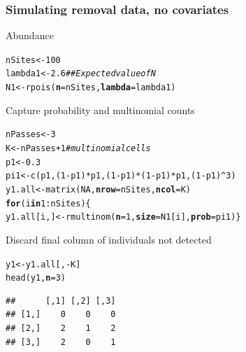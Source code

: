 \documentclass[color=usenames,dvipsnames]{beamer}\usepackage[]{graphicx}\usepackage[]{color}
\makeatletter
\newcommand{\hlnum}[1]{\textcolor[rgb]{0.69,0.494,0}{#1}}%
\newcommand{\hlcom}[1]{\textcolor[rgb]{0.514,0.506,0.514}{\textit{#1}}}%
\newcommand{\hlopt}[1]{\textcolor[rgb]{0,0,0}{#1}}%
\newcommand{\hlstd}[1]{\textcolor[rgb]{0,0,0}{#1}}%
\newcommand{\hlkwa}[1]{\textcolor[rgb]{0,0,0}{\textbf{#1}}}%
\newcommand{\hlkwb}[1]{\textcolor[rgb]{0,0.341,0.682}{#1}}%
\newcommand{\hlkwc}[1]{\textcolor[rgb]{0,0,0}{\textbf{#1}}}%
\newcommand{\hlkwd}[1]{\textcolor[rgb]{0.004,0.004,0.506}{#1}}%
\newenvironment{kframe}{%
 \def\at@end@of@kframe{}%
 \ifinner\ifhmode%
  \def\at@end@of@kframe{\end{minipage}}%
  \begin{minipage}{\columnwidth}%
 \fi\fi%
 \def\FrameCommand##1{\hskip\@totalleftmargin \hskip-\fboxsep
 \colorbox{shadecolor}{##1}\hskip-\fboxsep
     \hskip-\linewidth \hskip-\@totalleftmargin \hskip\columnwidth}%
 \MakeFramed {\advance\hsize-\width
   \@totalleftmargin\z@ \linewidth\hsize
   \@setminipage}}%
 {\par\unskip\endMakeFramed%
 \at@end@of@kframe}
\newenvironment{knitrout}{}{} %
\makeatother
\begin{document}
\begin{frame}[fragile]
  \frametitle{Simulating removal data, no covariates}
  \small
  Abundance
\begin{knitrout}\scriptsize
{}\color{fgcolor}\begin{kframe}
\begin{alltt}
\hlstd{nSites} \hlkwb{<-} \hlnum{100}
\hlstd{lambda1} \hlkwb{<-} \hlnum{2.6}  \hlcom{## Expected value of N}
\hlstd{N1} \hlkwb{<-} \hlkwd{rpois}\hlstd{(}\hlkwc{n}\hlstd{=nSites,} \hlkwc{lambda}\hlstd{=lambda1)}
\end{alltt}
\end{kframe}
\end{knitrout}
  \pause
  \vfill
  Capture probability and multinomial counts%
\begin{knitrout}\scriptsize
{}\color{fgcolor}\begin{kframe}
\begin{alltt}
\hlstd{nPasses} \hlkwb{<-} \hlnum{3}
\hlstd{K} \hlkwb{<-} \hlstd{nPasses}\hlopt{+}\hlnum{1}  \hlcom{# multinomial cells}
\hlstd{p1} \hlkwb{<-} \hlnum{0.3}
\hlstd{pi1} \hlkwb{<-} \hlkwd{c}\hlstd{(p1, (}\hlnum{1}\hlopt{-}\hlstd{p1)}\hlopt{*}\hlstd{p1, (}\hlnum{1}\hlopt{-}\hlstd{p1)}\hlopt{*}\hlstd{(}\hlnum{1}\hlopt{-}\hlstd{p1)}\hlopt{*}\hlstd{p1, (}\hlnum{1}\hlopt{-}\hlstd{p1)}\hlopt{^}\hlnum{3}\hlstd{)}
\hlstd{y1.all} \hlkwb{<-} \hlkwd{matrix}\hlstd{(}\hlnum{NA}\hlstd{,} \hlkwc{nrow}\hlstd{=nSites,} \hlkwc{ncol}\hlstd{=K)}
\hlkwa{for}\hlstd{(i} \hlkwa{in} \hlnum{1}\hlopt{:}\hlstd{nSites) \{}
    \hlstd{y1.all[i,]} \hlkwb{<-} \hlkwd{rmultinom}\hlstd{(}\hlkwc{n}\hlstd{=}\hlnum{1}\hlstd{,} \hlkwc{size}\hlstd{=N1[i],} \hlkwc{prob}\hlstd{=pi1)    \}}
\end{alltt}
\end{kframe}
\end{knitrout}
  \pause
  \vfill
  Discard final column of individuals not detected
\begin{knitrout}\scriptsize
{}\color{fgcolor}\begin{kframe}
\begin{alltt}
\hlstd{y1} \hlkwb{<-} \hlstd{y1.all[,}\hlopt{-}\hlstd{K]}
\hlkwd{head}\hlstd{(y1,} \hlkwc{n}\hlstd{=}\hlnum{3}\hlstd{)}
\end{alltt}
\begin{verbatim}
##      [,1] [,2] [,3]
## [1,]    0    0    0
## [2,]    2    1    2
## [3,]    2    0    1
\end{verbatim}
\end{kframe}
\end{knitrout}
\end{frame}
\end{document}
